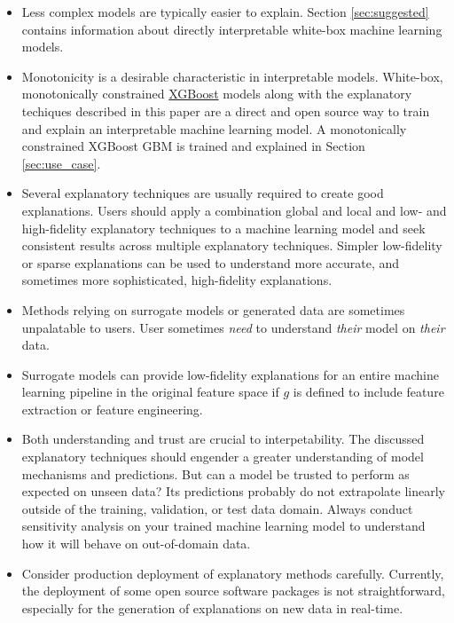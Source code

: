 \documentclass[11pt]{asaproc}
\begin{document}
\begin{itemize}	
	
	\item Less complex models are typically easier to explain. Section \ref{sec:suggested} contains information about directly interpretable white-box machine learning models.
	
	\item Monotonicity is a desirable characteristic in interpretable models. White-box, monotonically constrained \href{https://github.com/dmlc/xgboost}{XGBoost} models along with the explanatory techiques described in this paper are a direct and open source way to train and explain an interpretable machine learning model. A monotonically constrained XGBoost GBM is trained and explained in Section \ref{sec:use_case}.
	
	\item Several explanatory techniques are usually required to create good explanations. Users should apply a combination global and local and low- and high-fidelity explanatory techniques to a machine learning model and seek consistent results across multiple explanatory techniques. Simpler low-fidelity or sparse explanations can be used to understand more accurate, and sometimes more sophisticated, high-fidelity explanations.  

	\item Methods relying on surrogate models or generated data are sometimes unpalatable to users. User sometimes \textit{need} to understand \textit{their} model on \textit{their} data.
	
	\item Surrogate models can provide low-fidelity explanations for an entire machine learning pipeline in the original feature space if $g$ is defined to include feature extraction or feature engineering.
	
	\item Both understanding and trust are crucial to interpetability. The discussed explanatory techniques should engender a greater understanding of model mechanisms and predictions. But can a model be trusted to perform as expected on unseen data? Its predictions probably do not extrapolate linearly outside of the training, validation, or test data domain. Always conduct sensitivity analysis on your trained machine learning model to understand how it will behave on out-of-domain data.
	
	\item Consider production deployment of explanatory methods carefully. Currently, the deployment of some open source software packages is not straightforward, especially for the generation of explanations on new data in real-time.
	
\end{itemize}
\end{document}
